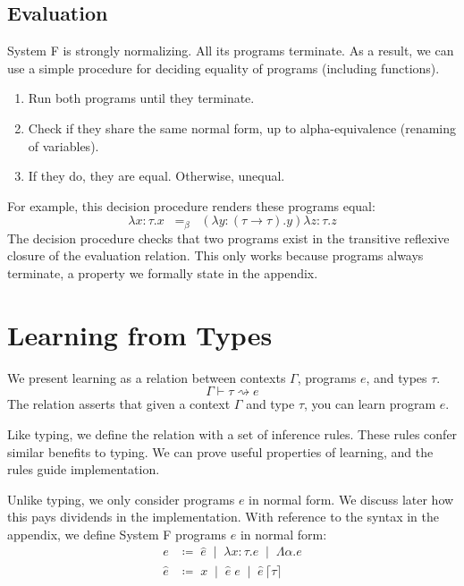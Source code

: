 \documentclass[sigplan,10pt]{acmart}
\newcommand{\lam}{\lambda}
\theoremstyle{mytheoremstyle}
\begin{document}
\subsection{Evaluation}
System F is strongly normalizing. All its programs terminate. As a result, we can use a simple procedure for deciding equality of programs (including functions). 
\begin{enumerate}
\item Run both programs until they terminate.
\item Check if they share the same normal form, up to alpha-equivalence (renaming of variables).
\item If they do, they are equal. Otherwise, unequal.
\end{enumerate}
For example, this decision procedure renders these programs equal:
$$\lambda x\!:\!\tau.x \;\;=_\beta\;\; (\lambda y\!:\!(\tau\to\tau).y)\lambda z\!:\!\tau.z$$
The decision procedure checks that two programs exist in the transitive reflexive closure of the evaluation relation. This only works because programs always terminate, a property we formally state in the appendix.

\section{Learning from Types}

We present learning as a relation between contexts $\Gamma$, programs $e$, and types $\tau$.
$$\Gamma \vdash \tau \rightsquigarrow e$$
The relation asserts that given a context $\Gamma$ and type $\tau$, you can learn program $e$.

Like typing, we define the relation with a set of inference rules. These rules confer similar benefits to typing. We can prove useful properties of learning, and the rules guide implementation. 

Unlike typing, we only consider programs $e$ in normal form. We discuss later how this pays dividends in the implementation. With reference to the syntax in the appendix, we define System F programs $e$ in normal form:
\begin{align*}
e &\coloneqq\; \hat{e} \;\mid\; \lam x\!:\!\tau.e \;\mid\; \Lambda\alpha.e\\
\hat{e} &\coloneqq\; x \;\mid\; \hat{e}\;e \;\mid\; \hat{e}\,\lceil\tau\rceil
\end{align*}
\end{document}
